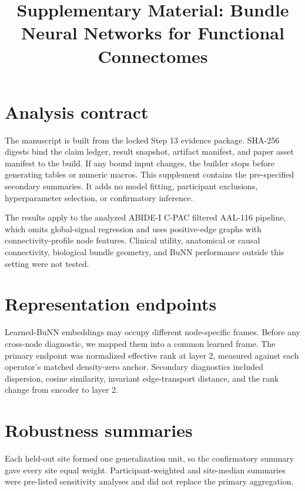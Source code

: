 \documentclass[conference,onecolumn]{IEEEtran}
\title{Supplementary Material: Bundle Neural Networks for Functional Connectomes}
\author{\IEEEauthorblockN{Adit Patil}
\IEEEauthorblockA{School of Scholars\\
Akola, India}}
\begin{document}
\maketitle

\section{Analysis contract}

The manuscript is built from the locked Step 13 evidence package. SHA-256
digests bind the claim ledger, result snapshot, artifact manifest, and paper
asset manifest to the build. If any bound input changes, the builder stops
before generating tables or numeric macros. This supplement contains the
pre-specified secondary summaries. It adds no model fitting, participant
exclusions, hyperparameter selection, or confirmatory inference.

The results apply to the analyzed ABIDE-I C-PAC filtered AAL-116 pipeline,
which omits global-signal regression and uses positive-edge graphs with
connectivity-profile node features. Clinical utility, anatomical or causal
connectivity, biological bundle geometry, and BuNN performance outside this
setting were not tested.

\section{Representation endpoints}

Learned-BuNN embeddings may occupy different node-specific frames. Before any
cross-node diagnostic, we mapped them into a common learned frame. The primary
endpoint was normalized effective rank at layer 2, measured against each
operator's matched density-zero anchor. Secondary diagnostics included
dispersion, cosine similarity, invariant edge-transport distance, and the rank
change from encoder to layer 2.



\section{Robustness summaries}

Each held-out site formed one generalization unit, so the confirmatory summary
gave every site equal weight. Participant-weighted and site-median summaries
were pre-listed sensitivity analyses and did not replace the primary
aggregation.


\end{document}
